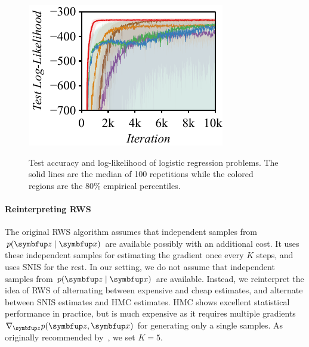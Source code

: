 \begin{figure}
{    \includegraphics[scale=0.80]{figures/pima_03.pdf}
  }
  \caption{Test accuracy and log-likelihood of logistic regression problems.
    The solid lines are the median of 100 repetitions while the colored regions are the 80\% empirical percentiles.
  }\label{fig:logistic}
\end{figure}


\paragraph{Reinterpreting RWS}
The original RWS algorithm assumes that independent samples from \(p(\vz\mid\vx)\) are available possibly with an additional cost.
It uses these independent samples for estimating the gradient once every \(K\) steps, and uses SNIS for the rest.
In our setting, we do not assume that independent samples from \(p(\vz\mid\vx)\) are available.
Instead, we reinterpret the idea of RWS of alternating between expensive and cheap estimates, and alternate between SNIS estimates and HMC estimates.
HMC shows excellent statistical performance in practice, but is much expensive as it requires multiple gradients \(\nabla_{\vz} p(\vz, \vx)\) for generating only a single samples.
As originally recommended by~\citet{DBLP:journals/corr/BornscheinB14}, we set \(K=5\).

